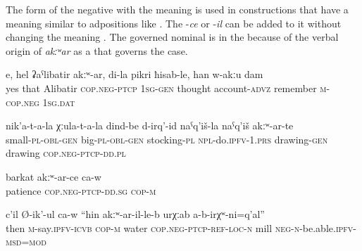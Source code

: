 The  form of the negative  with the meaning  is used in constructions that have a meaning similar to adpositions like . The  -\textit{ce} or -\textit{il} can be added to it without changing the meaning . The governed nominal is in the  because of the verbal origin of \textit{akːʷar} as a  that governs the  case.
%
\begin{exe}
	\ex
	\begin{xlist}
		\ex	\label{Yes, except Alibatir, in my mind, I do not remember}
		\gll	e,	hel	ʡaˁlibatir	akːʷ-ar,	di-la	pikri	ħisab-le,	han	w-akːu	dam   \\
			yes	that	Alibatir	\textsc{cop.neg}-\textsc{ptcp}	1\textsc{sg}-\textsc{gen}	thought	account-\textsc{advz}	remember	\textsc{m}-\textsc{cop.neg}	1\textsc{sg.}\textsc{dat}\\
		\glt	{}

		\ex	\label{For children, for adults we make stockings, those with a drawing, those without a drawing}
		\gll	nik'a-t-a-la	χːula-t-a-la	dind-be	d-irq'-id	naˁq'iš-la	naˁq'iš	akːʷ-ar-te \\
			small-\textsc{pl}-\textsc{obl}-\textsc{gen}	big-\textsc{pl}-\textsc{obl}-\textsc{gen}	stocking-\textsc{pl}	\textsc{npl}-do.\textsc{ipfv}-1.\textsc{prs}	drawing-\textsc{gen} drawing	\textsc{cop.neg}-\textsc{ptcp}-\textsc{dd.pl }\\
		\glt	{}

		\ex	\label{(He) lacks patience}
		\gll	barkat	akːʷ-ar-ce	ca-w  \\
			patience	\textsc{cop.neg}-\textsc{ptcp}-\textsc{dd}.\textsc{sg}	\textsc{cop-m}\\
		\glt	{}

		\ex	\label{‎‎He said, there where is no water a mill cannot be}
		\gll	c'il	Ø-ik'-ul ca-w		``hin	akːʷ-ar-il-le-b	urχːab	a-b-irχʷ-ni=q'al''  \\
			then	\textsc{m}-say.\textsc{ipfv}-\textsc{icvb} \textsc{cop-m} water \textsc{cop.neg}-\textsc{ptcp}-\textsc{ref}-\textsc{loc}-\textsc{n}	mill	\textsc{neg}-\textsc{n}-be.able.\textsc{ipfv}-\textsc{msd}=\textsc{mod}\\
		\glt	{}
	\end{xlist}
\end{exe}


